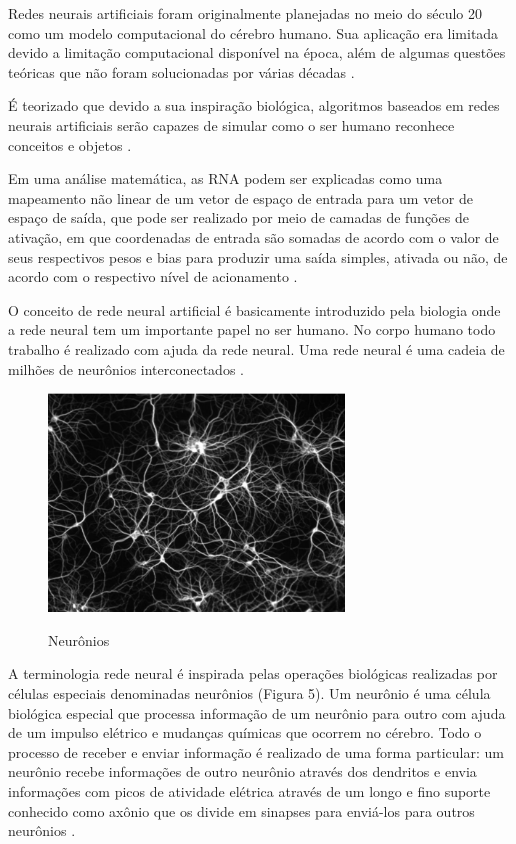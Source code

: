 Redes neurais artificiais foram originalmente planejadas no meio do século 20 como um modelo computacional do cérebro humano. Sua aplicação era limitada devido a limitação computacional disponível na época, além de algumas questões teóricas que não foram solucionadas por várias décadas \cite{mlpp}.

É teorizado que devido a sua inspiração biológica, algoritmos baseados em redes neurais artificiais serão capazes de simular como o ser humano reconhece conceitos e objetos \cite{learning-algorithms}.

Em uma análise matemática, as RNA podem ser explicadas como uma mapeamento não linear de um vetor de espaço de entrada para um vetor de espaço de saída, que pode ser realizado por meio de camadas de funções de ativação, em que coordenadas de entrada são somadas de acordo com o valor de seus respectivos pesos e bias  para produzir uma saída simples, ativada ou não, de acordo com o respectivo nível de acionamento \cite{two-phase-flow}.

O conceito de rede neural artificial é basicamente introduzido pela biologia onde a rede neural tem um importante papel no ser humano. No corpo humano todo trabalho é realizado com ajuda da rede neural. Uma rede neural é uma cadeia de milhões de neurônios interconectados \cite{ann}.

\begin{figure}[h]
    \caption{Neurônios}
    \centering
    \includegraphics[width=0.7\textwidth]{Textuais/Figuras/neuronios.png}
    \label{fig:neuronios}
\end{figure}

A terminologia rede neural é inspirada pelas operações biológicas realizadas por células especiais denominadas neurônios (Figura 5). Um neurônio é uma célula biológica especial que processa informação de um neurônio para outro com ajuda de um impulso elétrico e mudanças químicas que ocorrem no cérebro. Todo o processo de receber e enviar informação é realizado de uma forma particular: um neurônio recebe informações de outro neurônio através dos dendritos e envia informações com picos de atividade elétrica através de um longo e fino suporte conhecido como axônio que os divide em sinapses para enviá-los para outros neurônios \cite{ai}.

